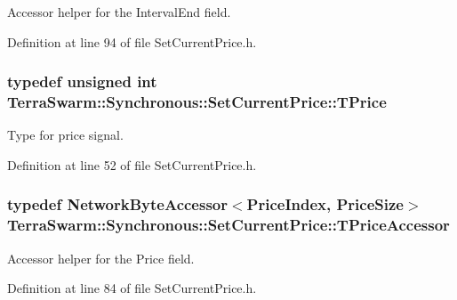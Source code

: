 Accessor helper for the Interval\-End field. 



Definition at line 94 of file Set\-Current\-Price.\-h.

\hypertarget{class_terra_swarm_1_1_synchronous_1_1_set_current_price_a2ed14f2a90070d19a70183bb63e7708e}{
\subsubsection[{T\-Price}]{\setlength{\rightskip}{0pt plus 5cm}typedef unsigned int {\bf Terra\-Swarm\-::\-Synchronous\-::\-Set\-Current\-Price\-::\-T\-Price}}}\label{class_terra_swarm_1_1_synchronous_1_1_set_current_price_a2ed14f2a90070d19a70183bb63e7708e}


Type for price signal. 



Definition at line 52 of file Set\-Current\-Price.\-h.

\hypertarget{class_terra_swarm_1_1_synchronous_1_1_set_current_price_a950c013f39e20f890173e81a716e3b6b}{
\subsubsection[{T\-Price\-Accessor}]{\setlength{\rightskip}{0pt plus 5cm}typedef {\bf Network\-Byte\-Accessor}$<${\bf Price\-Index}, {\bf Price\-Size}$>$ {\bf Terra\-Swarm\-::\-Synchronous\-::\-Set\-Current\-Price\-::\-T\-Price\-Accessor}\hspace{0.3cm}{\ttfamily [private]}}}\label{class_terra_swarm_1_1_synchronous_1_1_set_current_price_a950c013f39e20f890173e81a716e3b6b}


Accessor helper for the Price field. 



Definition at line 84 of file Set\-Current\-Price.\-h.



